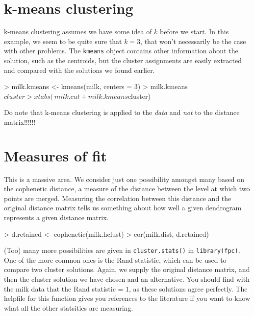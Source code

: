 \section{k-means clustering}

k-means clustering assumes we have some idea of $k$ before we start.   In this example, we seem to be quite sure that $k=3$, that won't necessarily be the case with other problems.   The \texttt{kmeans} object contains other information about the solution, such as the centroids, but the cluster assignments are easily extracted and compared with the solutions we found earlier.

\begin{Schunk}
\begin{Sinput}
> milk.kmeans <- kmeans(milk, centers = 3)
> milk.kmeans$cluster
> xtabs(~milk.cut + milk.kmeans$cluster)
\end{Sinput}
\end{Schunk}

Do note that k-means clustering is applied to the \emph{data} and \emph{not} to the distance matrix!!!!!!

\section{Measures of fit}

This is a massive area.   We consider just one possibility amongst many based on the cophenetic distance, a measure of the distance between the level at which two points are merged.   Measuring the correlation between this distance and the original distance matrix tells us something about how well a given dendrogram represents a given distance matrix.

\begin{Schunk}
\begin{Sinput}
> d.retained <- cophenetic(milk.hclust)
> cor(milk.dist, d.retained)
\end{Sinput}
\end{Schunk}

(Too) many more possibilities are given in \texttt{cluster.stats()} in \texttt{library(fpc)}.   One of the more common ones is the Rand statistic, which can be used to compare two cluster solutions.   Again, we supply the original distance matrix, and then the cluster solution we have chosen and an alternative.   You should find with the milk data that the Rand statistic = 1, as these solutions agree perfectly.  The helpfile for this function gives you references to the literature if you want to know what all the other statsitics are measuring.

